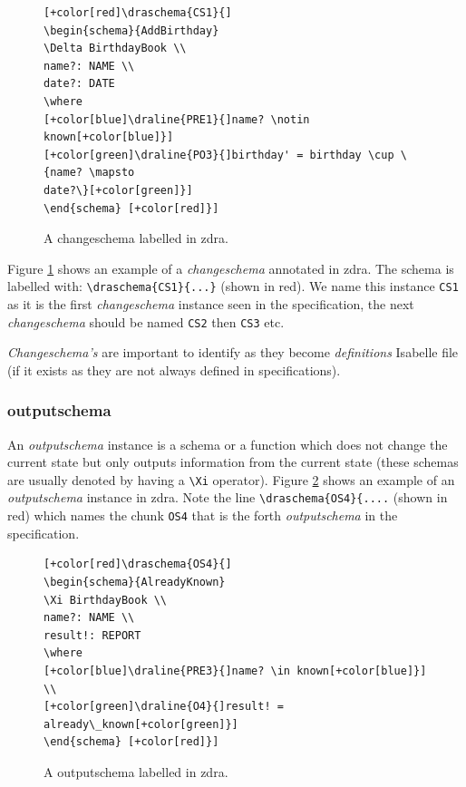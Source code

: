 \begin{center}
\begin{figure}[H]
\centering
\begin{footnotesize}
\begin{BVerbatim}[commandchars=+\[\]]
[+color[red]\draschema{CS1}{]
\begin{schema}{AddBirthday}
\Delta BirthdayBook \\
name?: NAME \\
date?: DATE
\where
[+color[blue]\draline{PRE1}{]name? \notin known[+color[blue]}]
[+color[green]\draline{PO3}{]birthday' = birthday \cup \{name? \mapsto
date?\}[+color[green]}]
\end{schema} [+color[red]}]
\end{BVerbatim}
\end{footnotesize}
\caption{\label{fig:exampleofcs} A changeschema labelled in \gls{zdra}.}
\end{figure}
\end{center}

Figure \ref{fig:exampleofcs} shows an example of a \emph{changeschema} annotated
in \gls{zdra}. The schema is labelled with: \verb|\draschema{CS1}{...}| (shown
in red). We name this instance \verb|CS1| as it is the first \emph{changeschema}
instance seen in the specification, the next \emph{changeschema} should be named
\verb|CS2| then \verb|CS3| etc.

\emph{Changeschema's} are important to identify as they become \emph{definitions}
Isabelle file (if it exists as they are not always defined in specifications).

\subsubsection{outputschema}

An \emph{outputschema} instance is a schema or a function which does not change
the current state but only outputs information from the current state (these
schemas are usually denoted by having a \verb|\Xi| operator). Figure
\ref{fig:exampleofos} shows an example of an \emph{outputschema} instance in
\gls{zdra}. Note the line \verb|\draschema{OS4}{....| (shown in red) which names
the chunk \verb|OS4| that is the forth \emph{outputschema} in the specification.

\begin{figure}[H]
\centering
\begin{footnotesize}
\begin{BVerbatim}[commandchars=+\[\]]
[+color[red]\draschema{OS4}{]
\begin{schema}{AlreadyKnown}
\Xi BirthdayBook \\
name?: NAME \\
result!: REPORT
\where
[+color[blue]\draline{PRE3}{]name? \in known[+color[blue]}] \\
[+color[green]\draline{O4}{]result! = already\_known[+color[green]}]
\end{schema} [+color[red]}]
\end{BVerbatim}
\end{footnotesize}
\caption{\label{fig:exampleofos} A outputschema labelled in \gls{zdra}.}
\end{figure}

